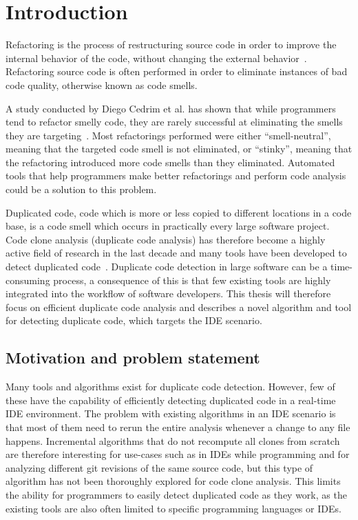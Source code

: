 \chapter{Introduction}

Refactoring is the process of restructuring source code in order to improve the internal
behavior of the code, without changing the external behavior~\cite[9]{fowlerrefactoring}.
Refactoring source code is often performed in order to eliminate instances of bad code
quality, otherwise known as code smells.

A study conducted by Diego Cedrim et al. has shown that while programmers tend to refactor
smelly code, they are rarely successful at eliminating the smells they are
targeting~\cite{Rohit_Gheyi_Impact}. Most refactorings performed were either
``smell-neutral'', meaning that the targeted code smell is not eliminated, or ``stinky'',
meaning that the refactoring introduced more code smells than they eliminated. Automated
tools that help programmers make better refactorings and perform code analysis could be a
solution to this problem. 

Duplicated code, code which is more or less copied to different locations in a code base,
is a code smell which occurs in practically every large software project. Code clone
analysis (duplicate code analysis) has therefore become a highly active field of research
in the last decade and many tools have been developed to detect duplicated
code~\cite[6]{Inoue_introduction_to_cc}. Duplicate code detection in large software can be
a time-consuming process, a consequence of this is that few existing tools are highly
integrated into the workflow of software developers. This thesis will therefore focus on
efficient duplicate code analysis and describes a novel algorithm and tool for detecting
duplicate code, which targets the IDE scenario.

\section{Motivation and problem statement}

Many tools and algorithms exist for duplicate code detection. However, few of these have
the capability of efficiently detecting duplicated code in a real-time IDE environment.
The problem with existing algorithms in an IDE scenario is that most of them need to rerun
the entire analysis whenever a change to any file happens. Incremental algorithms that do
not recompute all clones from scratch are therefore interesting for use-cases such as in
IDEs while programming and for analyzing different git revisions of the same source code,
but this type of algorithm has not been thoroughly explored for code clone analysis. This
limits the ability for programmers to easily detect duplicated code as they work, as the
existing tools are also often limited to specific programming languages or IDEs.

